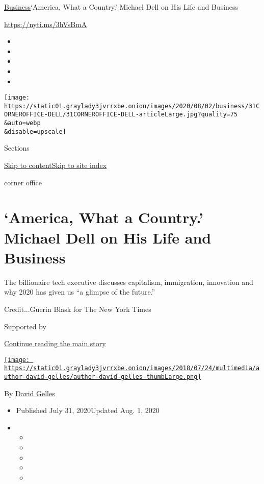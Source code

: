 \href{/section/business}{Business}\textbar{}`America, What a Country.'
Michael Dell on His Life and Business

\href{https://nyti.ms/3hVsBmA}{https://nyti.ms/3hVsBmA}

\begin{itemize}
\item
\item
\item
\item
\item
\end{itemize}

\texttt{[image: https://static01.graylady3jvrrxbe.onion/images/2020/08/02/business/31CORNEROFFICE-DELL/31CORNEROFFICE-DELL-articleLarge.jpg?quality=75\\\&auto=webp\\\&disable=upscale]}

Sections

\protect\hyperlink{site-content}{Skip to
content}\protect\hyperlink{site-index}{Skip to site index}

corner office

\hypertarget{america-what-a-country-michael-dell-on-his-life-and-business}{%
\section{`America, What a Country.' Michael Dell on His Life and
Business}\label{america-what-a-country-michael-dell-on-his-life-and-business}}

The billionaire tech executive discusses capitalism, immigration,
innovation and why 2020 has given us ``a glimpse of the future.''

Credit...Guerin Blask for The New York Times

Supported by

\protect\hyperlink{after-sponsor}{Continue reading the main story}

\href{https://www.nytimes3xbfgragh.onion/by/david-gelles}{\texttt{[image: https://static01.graylady3jvrrxbe.onion/images/2018/07/24/multimedia/author-david-gelles/author-david-gelles-thumbLarge.png]}}

By \href{https://www.nytimes3xbfgragh.onion/by/david-gelles}{David
Gelles}

\begin{itemize}
\item
  Published July 31, 2020Updated Aug. 1, 2020
\item
  \begin{itemize}
  \item
  \item
  \item
  \item
  \item
  \end{itemize}
\end{itemize}

